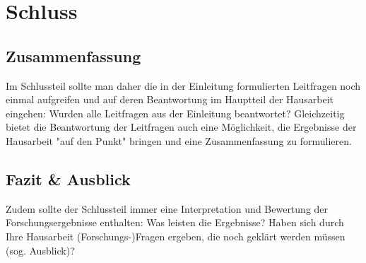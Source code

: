 \chapter{Schluss}

\section{Zusammenfassung}

Im Schlussteil sollte man daher die in der Einleitung formulierten Leitfragen noch einmal aufgreifen und auf deren Beantwortung im Hauptteil der Hausarbeit eingehen: Wurden alle Leitfragen aus der Einleitung beantwortet?
Gleichzeitig bietet die Beantwortung der Leitfragen auch eine Möglichkeit, die Ergebnisse der Hausarbeit "auf den Punkt" bringen und eine Zusammenfassung zu formulieren.

\section{Fazit \& Ausblick}

Zudem sollte der Schlussteil immer eine Interpretation und Bewertung der Forschungsergebnisse enthalten: Was leisten die Ergebnisse? Haben sich durch Ihre Hausarbeit (Forschungs-)Fragen ergeben, die noch geklärt werden müssen (sog. Ausblick)?

